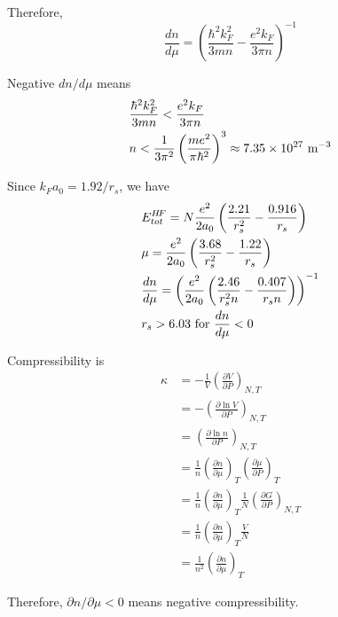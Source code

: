 \documentclass{article}
\begin{document}
Therefore,
\begin{equation*}
\frac{dn}{d\mu}=\left(\frac{\hbar^2k_F^2}{3mn}-\frac{e^2k_F}{3\pi n}\right)^{-1}
\end{equation*}

Negative $dn/d\mu$ means
\begin{align*}
&\frac{\hbar^2k_F^2}{3mn}<\frac{e^2k_F}{3\pi n}\\
&n<\frac{1}{3\pi^2}\left(\frac{me^2}{\pi\hbar^2}\right)^3\approx7.35\times 10^{27}\textup{ m}^{-3}
\end{align*}

Since $k_Fa_0=1.92/r_s$, we have
\begin{align*}
&E^{H\!F}_{tot}=N\frac{e^2}{2a_0}\left(\frac{2.21}{r_s^2}-\frac{0.916}{r_s}\right)\\
&\mu=\frac{e^2}{2a_0}\left(\frac{3.68}{r_s^2}-\frac{1.22}{r_s}\right)\\
&\frac{dn}{d\mu}=\left(\frac{e^2}{2a_0}\left(\frac{2.46}{r_s^2n}-\frac{0.407}{r_sn}\right)\right)^{-1}\\
&r_s>6.03\textup{ for }\frac{dn}{d\mu}<0
\end{align*}

Compressibility is
\begin{align*}
\kappa&=-\frac{1}{V}\left(\frac{\partial V}{\partial P}\right)_{N,T}\\
&=-\left(\frac{\partial\ln V}{\partial P}\right)_{N,T}\\
&=\left(\frac{\partial\ln n}{\partial P}\right)_{N,T}\\
&=\frac{1}{n}\left(\frac{\partial n}{\partial\mu}\right)_T\left(\frac{\partial\mu}{\partial P}\right)_T\\
&=\frac{1}{n}\left(\frac{\partial n}{\partial\mu}\right)_T\frac{1}{N}\left(\frac{\partial G}{\partial P}\right)_{N,T}\\
&=\frac{1}{n}\left(\frac{\partial n}{\partial\mu}\right)_T\frac{V}{N}\\
&=\frac{1}{n^2}\left(\frac{\partial n}{\partial\mu}\right)_T
\end{align*}

Therefore, $\partial n/\partial\mu<0$ means negative compressibility.
\end{document}

